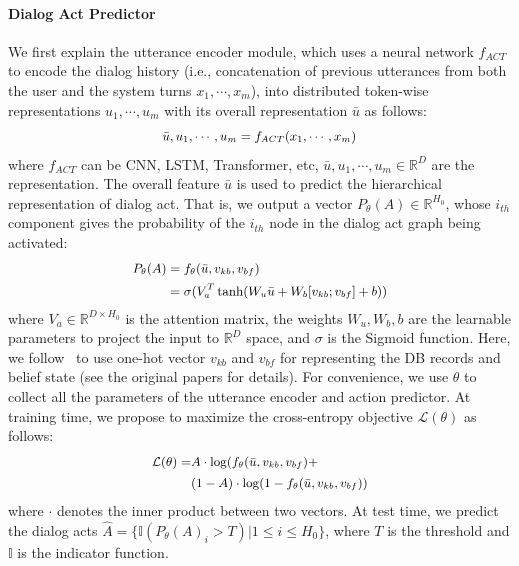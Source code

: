 \documentclass[11pt,a4paper]{article}
\begin{document}
\paragraph{Dialog Act Predictor}
We first explain the utterance encoder module, which uses a neural network $f_{ACT}$ to encode the dialog history (i.e., concatenation of previous utterances from both the user and the system turns $x_1, \cdots, x_m$), into distributed token-wise representations $u_1, \cdots, u_m$ with its overall representation $\bar{u}$ as follows:
\begin{align}
\small
\begin{split}
   \bar{u}, u_1, \cdots, u_m = f_{ACT}(x_1, \cdots, x_m)
\end{split}
\end{align}
where $f_{ACT}$ can be CNN, LSTM, Transformer, etc, $\bar{u}, u_1, \cdots, u_m \in \mathbb{R}^{D}$ are the representation. The overall feature $\bar{u}$ is used to predict the hierarchical representation of dialog act. That is, we output a vector $P_{\theta}(A) \in \mathbb{R}^{H_0}$, whose $i_{th}$ component gives the probability of the $i_{th}$ node in the dialog act graph being activated:
\begin{align}
\small
\begin{split}
    P_{\theta}(A) &= f_{\theta}(\bar{u}, v_{kb}, v_{bf}) \\
                  &= \sigma(V_a^T \tanh(W_u \bar{u} + W_b [v_{kb}; v_{bf}] + b))
\end{split}
\end{align}
where $V_a \in \mathbb{R}^{D \times H_0}$ is the attention matrix, the weights $W_u, W_b, b$ are the learnable parameters to project the input to $\mathbb{R}^D$ space, and $\sigma$ is the Sigmoid function. Here, we follow~\citet{DBLP:conf/emnlp/BudzianowskiWTC18,DBLP:conf/eacl/Rojas-BarahonaG17} to use one-hot vector $v_{kb}$ and $v_{bf}$ for representing the DB records and belief state (see the original papers for details). 
For convenience, we use $\theta$ to collect all the parameters of the utterance encoder and action predictor. At training time, we propose to maximize the cross-entropy objective $\mathcal{L}(\theta)$ as follows:
\begin{align}
\small
\begin{split}
    \mathcal{L}(\theta) =& A \cdot \log(f_{\theta}(\bar{u}, v_{kb}, v_{bf}) + \\
                        &(1 - A) \cdot \log(1 - f_{\theta}(\bar{u}, v_{kb}, v_{bf}))
\end{split}
\end{align}
where $\cdot$ denotes the inner product between two vectors. At test time, we predict the dialog acts $\hat{A}=\{\mathbb{I}(P_{\theta}(A)_i > T)|1\leq i\leq H_0\}$, where $T$ is the threshold and $\mathbb{I}$ is the indicator function.
\end{document}

